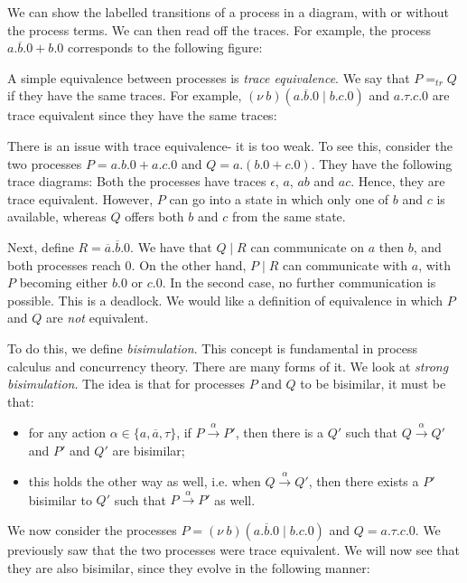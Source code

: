 \documentclass[a4paper, openany]{memoir}
\theoremstyle{definition}
\begin{document}
    We can show the labelled transitions of a process in a diagram, with or without the process terms. We can then read off the traces. For example, the process $a.\overline{b}.0 + b.0$ corresponds to the following figure:

    A simple equivalence between processes is \emph{trace equivalence}. We say that $P =_{tr} Q$ if they have the same traces. For example, $(\nu \ b)(a.\overline{b}.0 \mid b.c.0)$ and $a.\tau.c.0$ are trace equivalent since they have the same traces:

    There is an issue with trace equivalence- it is too weak. To see this, consider the two processes $P = a.b.0 + a.c.0$ and $Q = a.(b.0 + c.0)$. They have the following trace diagrams:
    Both the processes have traces $\epsilon$, $a$, $ab$ and $ac$. Hence, they are trace equivalent. However, $P$ can go into a state in which only one of $b$ and $c$ is available, whereas $Q$ offers both $b$ and $c$ from the same state. 

    Next, define $R = \overline{a}.\overline{b}.0$. We have that $Q \mid R$ can communicate on $a$ then $b$, and both processes reach $0$. On the other hand, $P \mid R$ can communicate with $a$, with $P$ becoming either $b.0$ or $c.0$. In the second case, no further communication is possible. This is a deadlock. We would like a definition of equivalence in which $P$ and $Q$ are \emph{not} equivalent.

    To do this, we define \emph{bisimulation}. This concept is fundamental in process calculus and concurrency theory. There are many forms of it. We look at \emph{strong bisimulation}. The idea is that for processes $P$ and $Q$ to be bisimilar, it must be that:
    \begin{itemize}
        \item for any action $\alpha \in \{a, \overline{a}, \tau\}$, if $P \xrightarrow{\alpha} P'$, then there is a $Q'$ such that $Q \xrightarrow{\alpha} Q'$ and $P'$ and $Q'$ are bisimilar;
        \item this holds the other way as well, i.e. when $Q \xrightarrow{\alpha} Q'$, then there exists a $P'$ bisimilar to $Q'$ such that $P \xrightarrow{\alpha} P'$ as well.
    \end{itemize}

    We now consider the processes $P = (\nu \ b)(a.\overline{b}.0 \mid b.c.0)$ and $Q = a.\tau.c.0$. We previously saw that the two processes were trace equivalent. We will now see that they are also bisimilar, since they evolve in the following manner:
\end{document}
